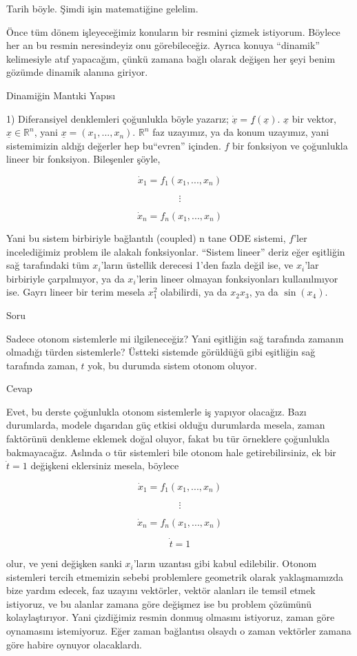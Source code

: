 \documentclass[12pt,fleqn]{article}\usepackage{../../common}
\begin{document}
Tarih böyle. Şimdi işin matematiğine gelelim. 

Önce tüm dönem işleyeceğimiz konuların bir resmini çizmek istiyorum. Böylece her
an bu resmin neresindeyiz onu görebileceğiz. Ayrıca konuya ``dinamik''
kelimesiyle atıf yapacağım, çünkü zamana bağlı olarak değişen her şeyi benim
gözümde dinamik alanına giriyor.

Dinamiğin Mantıki Yapısı 

1) Diferansiyel denklemleri çoğunlukla böyle yazarız;
$\dot{\underline{x}} = \underline{f}(\underline{x})$. $\underline{x}$
bir vektor, $\underline{x} \in \mathbb{R}^n$, yani $\underline{x} = (x_1,...,x_n)$.
$\mathbb{R}^n$ faz uzayımız, ya da konum uzayımız, yani sistemimizin aldığı
değerler hep bu``evren'' içinden. $f$ bir fonksiyon ve çoğunlukla lineer bir
fonksiyon. Bileşenler şöyle,

$$ \dot{x}_1 = f_1(x_1,...,x_n)$$

$$ \vdots $$

$$ \dot{x}_n = f_n(x_1,...,x_n)$$

Yani bu sistem birbiriyle bağlantılı (coupled) n tane ODE sistemi, $f$'ler
incelediğimiz problem ile alakalı fonksiyonlar. ``Sistem lineer'' deriz eğer
eşitliğin sağ tarafındaki tüm $x_i$'ların üstellik derecesi 1'den fazla değil
ise, ve $x_i$'lar birbiriyle çarpılmıyor, ya da $x_i$'lerin lineer olmayan
fonksiyonları kullanılmıyor ise. Gayrı lineer bir terim mesela $x_1^2$
olabilirdi, ya da $x_2x_3$, ya da $\sin(x_4)$.

Soru

Sadece otonom sistemlerle mi ilgileneceğiz? Yani eşitliğin sağ tarafında zamanın
olmadığı türden sistemlerle? Üstteki sistemde görüldüğü gibi eşitliğin sağ
tarafında zaman, $t$ yok, bu durumda sistem otonom oluyor.

Cevap

Evet, bu derste çoğunlukla otonom sistemlerle iş yapıyor olacağız. Bazı
durumlarda, modele dışarıdan güç etkisi olduğu durumlarda mesela, zaman
faktörünü denkleme eklemek doğal oluyor, fakat bu tür örneklere çoğunlukla
bakmayacağız. Aslında o tür sistemleri bile otonom hale getirebilirsiniz,
ek bir $\dot{t} = 1$ değişkeni eklersiniz mesela, böylece 

$$ \dot{x}_1 = f_1(x_1,...,x_n)$$

$$ \vdots $$

$$ \dot{x}_n = f_n(x_1,...,x_n)$$

$$ \dot{t} = 1$$

olur, ve yeni değişken sanki $x_i$'ların uzantısı gibi kabul
edilebilir. Otonom sistemleri tercih etmemizin sebebi problemlere geometrik
olarak yaklaşmamızda bize yardım edecek, faz uzayını vektörler, vektör
alanları ile temsil etmek istiyoruz, ve bu alanlar zamana göre değişmez ise
bu problem çözümünü kolaylaştırıyor. Yani çizdiğimiz resmin donmuş olmasını
istiyoruz, zaman göre oynamasını istemiyoruz. Eğer zaman bağlantısı olsaydı
o zaman vektörler zamana göre habire oynuyor olacaklardı. 
\end{document}
